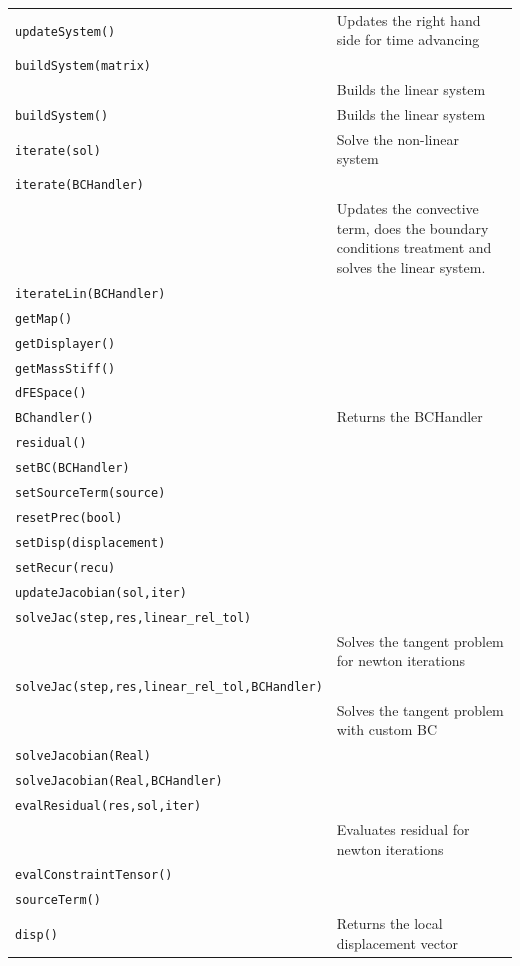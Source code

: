 \documentclass[11pt]{article}
\begin{document}
\begin{center}
\begin{longtable}{p{3cm}p{8cm}}
	\hline
	\texttt{updateSystem()} & Updates the right hand side for time advancing\\
	\texttt{buildSystem(matrix)} \\
	& Builds the linear system\\
	\texttt{buildSystem()} & Builds the linear system\\
	\texttt{iterate(sol)} & Solve the non-linear system\\
	\texttt{iterate(BCHandler)} \\
	& Updates the convective term, does the boundary conditions treatment and solves the linear system.\\
	\texttt{iterateLin(BCHandler)} & \\
	\texttt{getMap()} & \\
	\texttt{getDisplayer()} & \\
	\texttt{getMassStiff()} & \\
	\texttt{dFESpace()} & \\
	\texttt{BChandler()} & Returns the BCHandler\\
	\texttt{residual()} & \\
	\texttt{setBC(BCHandler)} & \\
	\texttt{setSourceTerm(source)} & \\
	\texttt{resetPrec(bool)} & \\
	\texttt{setDisp(displacement)} & \\
	\texttt{setRecur(recu)} & \\
	\texttt{updateJacobian(sol,iter)} & \\
	\texttt{solveJac(step,res,linear\_rel\_tol)} \\
	& Solves the tangent problem for newton iterations\\
	\texttt{solveJac(step,res,linear\_rel\_tol,BCHandler)} \\
	& Solves the tangent problem with custom BC \\
	\texttt{solveJacobian(Real)} & \\
	\texttt{solveJacobian(Real,BCHandler)} & \\
	\texttt{evalResidual(res,sol,iter)} \\
	& Evaluates residual for newton iterations \\
	\texttt{evalConstraintTensor()} & \\
	\texttt{sourceTerm()} & \\
	\texttt{disp()} & Returns the local displacement vector\\

\end{longtable}
\end{center}
\end{document}
